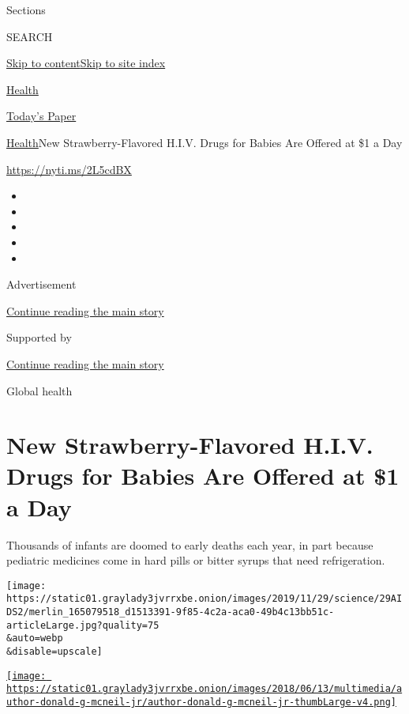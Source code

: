 Sections

SEARCH

\protect\hyperlink{site-content}{Skip to
content}\protect\hyperlink{site-index}{Skip to site index}

\href{https://www.nytimes3xbfgragh.onion/section/health}{Health}

\href{https://myaccount.nytimes3xbfgragh.onion/auth/login?response_type=cookie\&client_id=vi}{}

\href{https://www.nytimes3xbfgragh.onion/section/todayspaper}{Today's
Paper}

\href{/section/health}{Health}\textbar{}New Strawberry-Flavored H.I.V.
Drugs for Babies Are Offered at \$1 a Day

\url{https://nyti.ms/2L5cdBX}

\begin{itemize}
\item
\item
\item
\item
\item
\end{itemize}

Advertisement

\protect\hyperlink{after-top}{Continue reading the main story}

Supported by

\protect\hyperlink{after-sponsor}{Continue reading the main story}

Global health

\hypertarget{new-strawberry-flavored-hiv-drugs-for-babies-are-offered-at-1-a-day}{%
\section{New Strawberry-Flavored H.I.V. Drugs for Babies Are Offered at
\$1 a
Day}\label{new-strawberry-flavored-hiv-drugs-for-babies-are-offered-at-1-a-day}}

Thousands of infants are doomed to early deaths each year, in part
because pediatric medicines come in hard pills or bitter syrups that
need refrigeration.

\texttt{[image: https://static01.graylady3jvrrxbe.onion/images/2019/11/29/science/29AIDS2/merlin\_165079518\_d1513391-9f85-4c2a-aca0-49b4c13bb51c-articleLarge.jpg?quality=75\\\&auto=webp\\\&disable=upscale]}

\href{https://www.nytimes3xbfgragh.onion/by/donald-g-mcneil-jr}{\texttt{[image: https://static01.graylady3jvrrxbe.onion/images/2018/06/13/multimedia/author-donald-g-mcneil-jr/author-donald-g-mcneil-jr-thumbLarge-v4.png]}}

